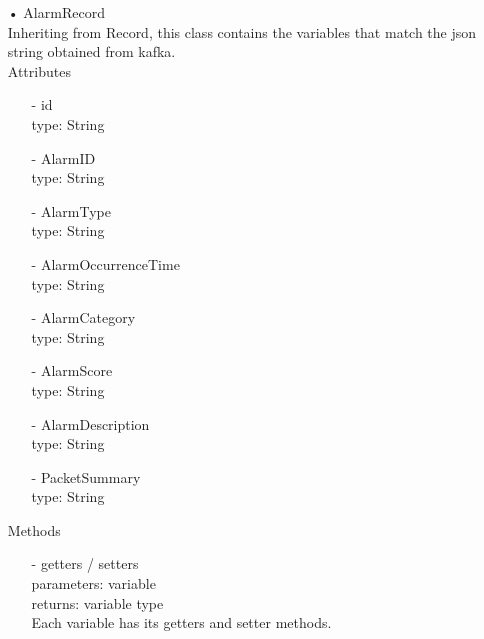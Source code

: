 \documentclass[oneside, english, final]{design}
\begin{document}
\begin{itemize}
	\item[•]AlarmRecord
	      \\Inheriting from Record, this class contains the variables that match the json string obtained from kafka.
	      \\Attributes
	      \begin{itemize}
		      \item[-] id
		            \\type: String
		      \item[-] AlarmID
		            \\type: String
		      \item[-] AlarmType
		            \\type: String
		      \item[-] AlarmOccurrenceTime
		            \\type: String
		      \item[-] AlarmCategory
		            \\type: String
		      \item[-] AlarmScore
		            \\type: String
		      \item[-] AlarmDescription
		            \\type: String
		      \item[-] PacketSummary
		            \\type: String

	      \end{itemize}
	      Methods
	      \begin{itemize}
		      \item[-]getters / setters
		            \\parameters: variable
		            \\returns: variable type
		            \\Each variable has its getters and setter methods.
	      \end{itemize}


\end{itemize}
\end{document}
